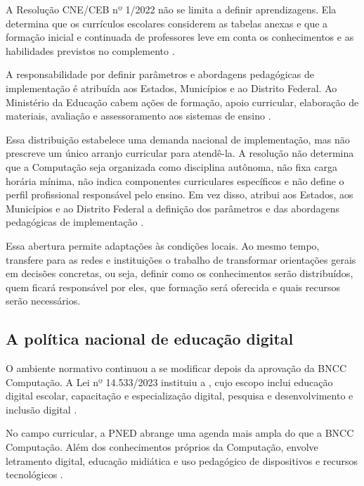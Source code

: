 A Resolução CNE/CEB nº 1/2022 não se limita a definir aprendizagens. Ela determina que os currículos escolares considerem as tabelas anexas e que a formação inicial e continuada de professores leve em conta os conhecimentos e as habilidades previstos no complemento \cite{brasil2022resolucao1}.

A responsabilidade por definir parâmetros e abordagens pedagógicas de implementação é atribuída aos Estados, Municípios e ao Distrito Federal. Ao Ministério da Educação cabem ações de formação, apoio curricular, elaboração de materiais, avaliação e assessoramento aos sistemas de ensino \cite{brasil2022resolucao1}.

Essa distribuição estabelece uma demanda nacional de implementação, mas não prescreve um único arranjo curricular para atendê-la. A resolução não determina que a Computação seja organizada como disciplina autônoma, não fixa carga horária mínima, não indica componentes curriculares específicos e não define o perfil profissional responsável pelo ensino. Em vez disso, atribui aos Estados, aos Municípios e ao Distrito Federal a definição dos parâmetros e das abordagens pedagógicas de implementação \cite{brasil2022resolucao1}.

Essa abertura permite adaptações às condições locais. Ao mesmo tempo, transfere para as redes e instituições o trabalho de transformar orientações gerais em decisões concretas, ou seja, definir como os conhecimentos serão distribuídos, quem ficará responsável por eles, que formação será oferecida e quais recursos serão necessários.

\subsection{A política nacional de educação digital}
\label{subsec:politica-nacional-educacao-digital}

O ambiente normativo continuou a se modificar depois da aprovação da BNCC Computação. A Lei nº 14.533/2023 instituiu a , cujo escopo inclui educação digital escolar, capacitação e especialização digital, pesquisa e desenvolvimento e inclusão digital \cite{brasil2023pned}.

No campo curricular, a PNED abrange uma agenda mais ampla do que a BNCC Computação. Além dos conhecimentos próprios da Computação, envolve letramento digital, educação midiática e uso pedagógico de dispositivos e recursos tecnológicos \cite{brasil2023pned}.

